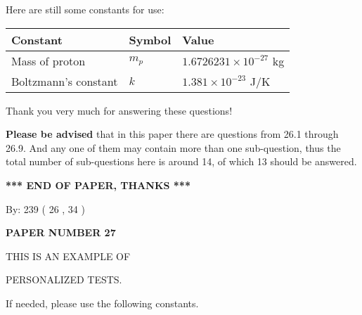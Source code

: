 \documentclass[12pt]{article}
\begin{document}
 
 
   
   
 \vspace{0.2in}
Here are still some constants for use:
 
 
\noindent\begin{tabular}{|l|l|l|}
\hline
Constant & Symbol & Value \\
\hline
 
Mass of proton &
$m_p$ &
 $ 1.6726231 \times 10^{-27} $
kg \\
\hline
 
Boltzmann's constant &
$k$ &
 $ 1.381 \times 10^{-23} $
J/K \\
\hline
 
\end{tabular}
 
Thank you very much for answering these questions!
 
{\textbf{\large{Please be advised}}} that in this paper there are questions from
26.1 through
26.9.
And any one of them may contain more than one sub-question, thus the total number
of sub-questions here is around 14, of which
13 should be answered.
 
   
   
   
   
\vspace{1.0in} 
{\textbf{\large{ *** END OF PAPER, THANKS *** }}} 
   
   
\hspace{1.0in} By: 
         239 (          26 ,           34 )
   
   
   
   
\newpage 
\setcounter{page}{ 
    27001 } 
   
   
   
   
 {\textbf{ \Large{ PAPER NUMBER           27  }}}
   
   
\vspace{0.2in}
   
   
   
   
   
   
 \vspace{0.2in}
 
 
{\Huge  THIS IS AN EXAMPLE OF}
 
{\Huge  PERSONALIZED TESTS. }
 
If needed, please use the following constants.
 
\end{document}
